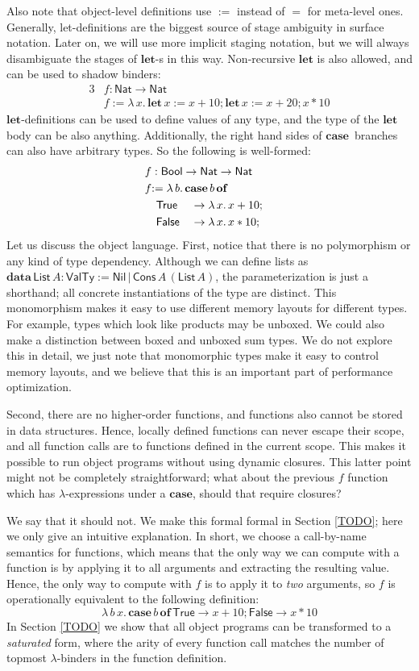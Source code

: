 \documentclass[acmsmall,screen,review,anonymous]{acmart}
\newcommand{\msf}[1]{\mathsf{#1}}
\newcommand{\mbf}[1]{\mathbf{#1}}
\newcommand{\ind}{\hspace{1em}}
\newcommand{\lam}{\lambda\,}
\newcommand{\data}{\mbf{data}\,}
\newcommand{\of}{\mbf{of}\,}
\newcommand{\letdef}{\mbf{let\,}}
\newcommand{\List}{\msf{List}}
\newcommand{\Nil}{\msf{Nil}}
\newcommand{\Cons}{\msf{Cons}}
\newcommand{\Bool}{\msf{Bool}}
\newcommand{\case}{\mbf{case\,}}
\newcommand{\VTy}{\msf{ValTy}}
\newcommand{\True}{\msf{True}}
\newcommand{\False}{\msf{False}}
\newcommand{\Nat}{\msf{Nat}}
\begin{document}
Also note that object-level definitions use $:=$ instead of $=$ for meta-level
ones. Generally, let-definitions are the biggest source of stage ambiguity in
surface notation. Later on, we will use more implicit staging notation, but we
will always disambiguate the stages of $\mbf{let}$-s in this way. Non-recursive
$\mbf{let}$ is also allowed, and can be used to shadow binders:
\begin{alignat*}{3}
  &f : \Nat \to \Nat\\
  &f := \lam x.\,\letdef x := x + 10; \letdef x := x + 20; x * 10
\end{alignat*}
$\mbf{let}$-definitions can be used to define values of any type, and the type
of the $\mbf{let}$ body can be also anything. Additionally, the right hand sides
of $\case$ branches can also have arbitrary types. So the following is
well-formed:
\begin{alignat*}{3}
  &f : \mathrlap{\Bool \to \Nat \to \Nat}\\
  &f \mathrlap{:= \lam b.\,\case b\,\of}\\
  &\ind \True  &&\to \lam x.\, x + 10;\\
  &\ind \False &&\to \lam x.\, x * 10;
\end{alignat*}
Let us discuss the object language. First, notice that there is no polymorphism
or any kind of type dependency. Although we can define lists as $\data \List\,A
: \VTy := \Nil\,|\,\Cons\,A\,(\List\,A)$, the parameterization is just a
shorthand; all concrete instantiations of the type are distinct. This
monomorphism makes it easy to use different memory layouts for different types.
For example, types which look like products may be unboxed. We could also make a
distinction between boxed and unboxed sum types. We do not explore this in
detail, we just note that monomorphic types make it easy to control memory
layouts, and we believe that this is an important part of performance
optimization.

Second, there are no higher-order functions, and functions also cannot be stored
in data structures. Hence, locally defined functions can never escape their
scope, and all function calls are to functions defined in the current
scope. This makes it possible to run object programs without using dynamic
closures. This latter point might not be completely straightforward; what
about the previous $f$ function which has $\lambda$-expressions under a
$\mbf{case}$, should that require closures?

We say that it should not. We make this formal formal in Section \ref{TODO};
here we only give an intuitive explanation. In short, we choose a call-by-name
semantics for functions, which means that the only way we can compute with a
function is by applying it to all arguments and extracting the resulting value.
Hence, the only way to compute with $f$ is to apply it to \emph{two} arguments,
so $f$ is operationally equivalent to the following definition:
\[ \lam b\,x.\,\case b\,\of \True \to x + 10; \False \to x * 10 \]
In Section \ref{TODO} we show that all object programs can be transformed to a
\emph{saturated} form, where the arity of every function call matches the number
of topmost $\lambda$-binders in the function definition.
\end{document}
